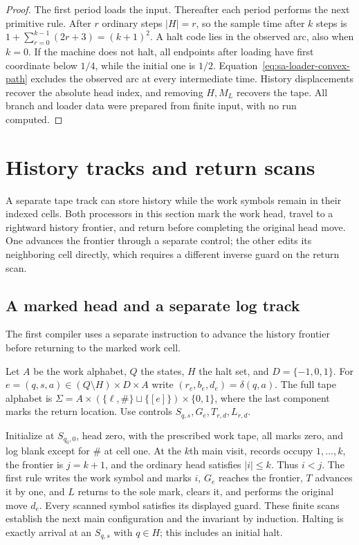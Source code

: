\begin{proof}
The first period loads the input.  Thereafter each period performs the
next primitive rule.  After $r$ ordinary steps $|H|=r$, so the sample
time after $k$ steps is
$1+\sum_{r=0}^{k-1}(2r+3)=(k+1)^2$.
A halt code lies in the observed arc, also when $k=0$.
If the machine does not halt, all endpoints after loading have first
coordinate below $1/4$, while the initial one is $1/2$.
Equation~\eqref{eq:sa-loader-convex-path} excludes the observed arc at
every intermediate time.  History displacements recover the absolute
head index, and removing $H,M_L$ recovers the tape.  All branch and
loader data were prepared from finite input, with no run computed.
\end{proof}

\section{History tracks and return scans}
\label{sec:sa-track-histories}
A separate tape track can store history while the work symbols remain in
their indexed cells.  Both processors in this section mark the work head,
travel to a rightward history frontier, and return before completing the
original head move.  One advances the frontier through a separate control;
the other edits its neighboring cell directly, which requires a different
inverse guard on the return scan.

\subsection{A marked head and a separate log track}
\label{subsec:sa-marked-head-plane}
The first compiler uses a separate instruction to advance the history
frontier before returning to the marked work cell.

Let $A$ be the work alphabet, $Q$ the states, $H$ the halt set, and
$D=\{-1,0,1\}$.  For $e=(q,s,a)\in(Q\setminus H)\times D\times A$
write $(r_e,b_e,d_e)=\delta(q,a)$.  The full tape alphabet is
$\Sigma=A\times(\{\ell,\#\}\sqcup\{[e]\})\times\{0,1\}$,
where the last component marks the return location.
Use controls $S_{q,s},G_e,T_{r,d},L_{r,d}$.

Initialize at $S_{q_0,0}$, head zero, with the prescribed work tape,
all marks zero, and log blank except for $\#$ at cell one.
At the $k$th main visit, records occupy $1,\ldots,k$, the frontier is
$j=k+1$, and the ordinary head satisfies $|i|\le k$.  Thus $i<j$.
The first rule writes the work symbol and marks $i$, $G_e$ reaches the
frontier, $T$ advances it by one, and $L$ returns to the sole mark,
clears it, and performs the original move $d_e$.  Every scanned symbol
satisfies its displayed guard.  These finite scans establish the next
main configuration and the invariant by induction.  Halting is exactly
arrival at an $S_{q,s}$ with $q\in H$; this includes an initial halt.

